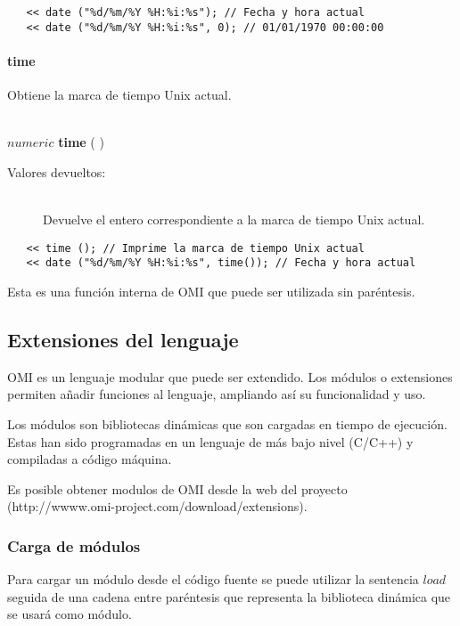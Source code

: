 \begin{lstlisting}  
   << date ("%d/%m/%Y %H:%i:%s"); // Fecha y hora actual
   << date ("%d/%m/%Y %H:%i:%s", 0); // 01/01/1970 00:00:00
\end{lstlisting}


\paragraph{time}
Obtiene la marca de tiempo Unix actual.  

\begin{framed}
\hfill \\ $numeric$ \textbf{time} ( )  
\begin{description}
\item[Valores devueltos:] \hfill \\
   Devuelve el entero correspondiente a la marca de tiempo Unix actual.
\end{description}
\end{framed}

\begin{lstlisting}  
   << time (); // Imprime la marca de tiempo Unix actual
   << date ("%d/%m/%Y %H:%i:%s", time()); // Fecha y hora actual 
\end{lstlisting}

Esta es una función interna de OMI que puede ser utilizada sin paréntesis.

\subsection{Extensiones del lenguaje}
OMI es un lenguaje modular que puede ser extendido. 
Los módulos o extensiones permiten añadir funciones al lenguaje, ampliando así su funcionalidad y uso.

Los módulos son bibliotecas dinámicas que son cargadas en tiempo de ejecución. Estas
han sido programadas en un lenguaje de más bajo nivel (C/C++) y compiladas a código máquina. 

Es posible obtener modulos de OMI desde la web del proyecto 
(http://wwww.omi-project.com/download/extensions). 

\subsubsection{Carga de módulos}
Para cargar un módulo desde el código fuente se puede utilizar la sentencia $load$ seguida de 
una cadena entre paréntesis que representa la biblioteca dinámica que se usará como módulo. \\

